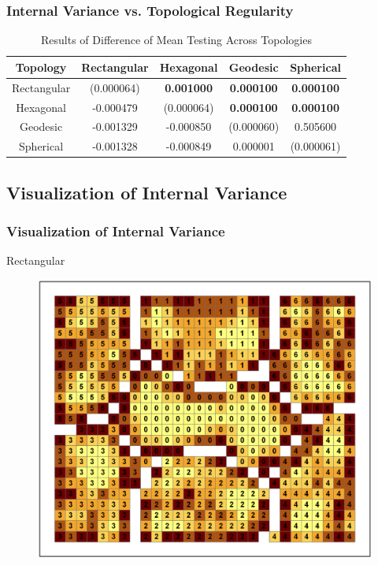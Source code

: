 \documentclass[nototal,handout]{beamer}
\begin{document}
\begin{frame}
	\frametitle{Internal Variance vs. Topological Regularity}
  \begin{table}
    \begin{minipage}{\textwidth}
    \caption{Results of Difference of Mean Testing Across Topologies}
    \label{rlt:all}
    \begin{tabular}{|c||c|c|c|c|}
    \hline
    \textbf{Topology}&Rectangular				&Hexagonal &Geodesic &Spherical\\\hline
    \hline
 		Rectangular & (0.000064) & \textbf{0.001000} & \textbf{0.000100} & \textbf{0.000100}\\\hline
 		Hexagonal & -0.000479 & (0.000064) & \textbf{0.000100} & \textbf{0.000100}\\\hline
 		Geodesic & -0.001329 & -0.000850 & (0.000060) & 0.505600\\\hline
 		Spherical & -0.001328 & -0.000849 & 0.000001 & (0.000061)\\\hline
 
    \end{tabular}
    \end{minipage}
  \end{table}
 \end{frame} 

\subsection{Visualization of Internal Variance} 

\begin{frame}
	\frametitle{Visualization of Internal Variance}
 
\begin{block}{Rectangular}
  \begin{center}
  \begin{figure}
  \includegraphics[width=0.70\linewidth]{rook_clusters.png}
  \end{figure}
  \end{center}
 \end{block} \end{frame} 
\end{document}
